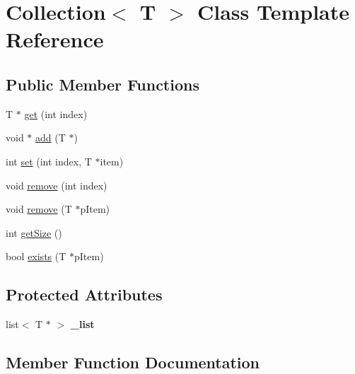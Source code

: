 \hypertarget{class_collection}{}\section{Collection$<$ T $>$ Class Template Reference}
\label{class_collection}
\subsection*{Public Member Functions}
\begin{DoxyCompactItemize}
\item 
T $\ast$ \mbox{\hyperlink{class_collection_a64cd1dc1f2099f0baa1e8ddb0efdd470}{get}} (int index)
\item 
void $\ast$ \mbox{\hyperlink{class_collection_ac05ab0d5f369c5a645123bad16d102c1}{add}} (T $\ast$)
\item 
int \mbox{\hyperlink{class_collection_a172de5b961f68075b07ce17c4dc79d94}{set}} (int index, T $\ast$item)
\item 
void \mbox{\hyperlink{class_collection_a11e03bd78c5b0234fe075b69f776b800}{remove}} (int index)
\item 
void \mbox{\hyperlink{class_collection_a6d5b06e5d2528c1251a5eb8b79ce756b}{remove}} (T $\ast$p\+Item)
\item 
int \mbox{\hyperlink{class_collection_a2fc76ab0d838768768ccb5df10aee711}{get\+Size}} ()
\item 
bool \mbox{\hyperlink{class_collection_a7c44d6d2aad8c98fbfe597646d7fd4ff}{exists}} (T $\ast$p\+Item)
\end{DoxyCompactItemize}
\subsection*{Protected Attributes}
\begin{DoxyCompactItemize}
\item 
\mbox{\label{class_collection_a01e649ea61c423771fc84aed675996b4}} 
list$<$ T $\ast$ $>$ {\bfseries \+\_\+list}
\end{DoxyCompactItemize}


\subsection{Member Function Documentation}
\mbox{\label{class_collection_ac05ab0d5f369c5a645123bad16d102c1}} 
